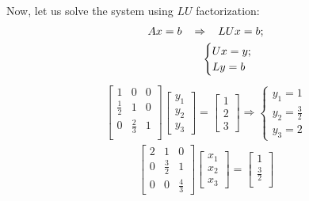 \documentclass[letterpaper,10pt,english]{jupyterBook}
\begin{document}
\sphinxAtStartPar
Now, let us solve the system using \(LU\) factorization:
\begin{equation*}
\begin{split}
Ax = b \hspace{3mm} \Rightarrow \hspace{3mm} LUx = b;
\\
\begin{align*}
\begin{cases}
Ux = y;\\
Ly = b
\end{cases}
\end{align*}
\end{split}
\end{equation*}\begin{equation*}
\begin{split}
\begin{bmatrix}
  1 & 0 & 0\\
  \frac{1}{2} & 1 & 0\\
  0 & \frac{2}{3} & 1\\
\end{bmatrix}
\begin{bmatrix}
  y_1\\
  y_2\\
  y_3
\end{bmatrix}
=
\begin{bmatrix}
1\\
2\\
3
\end{bmatrix}
\Rightarrow
\begin{cases}
y_1 = 1\\
y_2 = \frac{3}{2}\\
y_3 = 2
\end{cases}
\end{split}
\end{equation*}\begin{equation*}
\begin{split}
\begin{bmatrix}
2 & 1 & 0\\
0 & \frac{3}{2} & 1\\
0 & 0 & \frac{4}{3}
\end{bmatrix}
\begin{bmatrix}
x_1\\
x_2\\
x_3
\end{bmatrix}
=
\begin{bmatrix}
1\\
\frac{3}{2}\\

\end{bmatrix}
\end{split}
\end{equation*}
\end{document}
